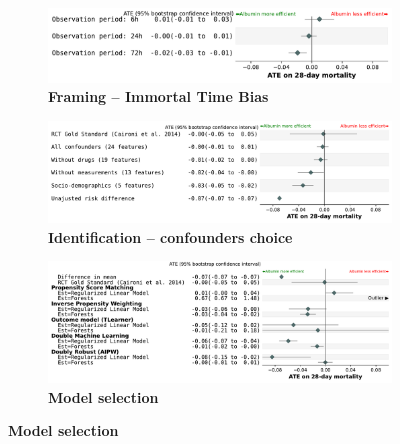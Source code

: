 \documentclass[10pt,letterpaper]{article}
\providecommand{\DIFaddbeginFL}{} %
\providecommand{\DIFaddendFL}{} %
\providecommand{\DIFdelbeginFL}{} %
\providecommand{\DIFdelendFL}{} %
\newcommand{\DIFscaledelfig}{0.5}
\newlength{\DIFdelgraphicswidth} %
\newlength{\DIFdelgraphicsheight} %
\newcommand{\DIFaddincludegraphics}[2][]{{\color{blue}\fbox{\DIFOincludegraphics[#1]{#2}}}} %
\newcommand{\DIFdelincludegraphics}[2][]{%
\sbox{\DIFdelgraphicsbox}{\DIFOincludegraphics[#1]{#2}}%
\settoboxwidth{\DIFdelgraphicswidth}{\DIFdelgraphicsbox} %
\settoboxtotalheight{\DIFdelgraphicsheight}{\DIFdelgraphicsbox} %
\scalebox{\DIFscaledelfig}{%
\parbox[b]{\DIFdelgraphicswidth}{\usebox{\DIFdelgraphicsbox}\\[-\baselineskip] \rule{\DIFdelgraphicswidth}{0em}}\llap{\resizebox{\DIFdelgraphicswidth}{\DIFdelgraphicsheight}{%
\setlength{\unitlength}{\DIFdelgraphicswidth}%
\begin{picture}(1,1)%
\thicklines\linethickness{2pt} %
{\color[rgb]{1,0,0}\put(0,0){\framebox(1,1){}}}%
{\color[rgb]{1,0,0}\put(0,0){\line( 1,1){1}}}%
{\color[rgb]{1,0,0}\put(0,1){\line(1,-1){1}}}%
\end{picture}%
}\hspace*{3pt}}} %
} %
\DeclareRobustCommand{\DIFaddbeginFL}{\DIFOaddbeginFL \let\includegraphics\DIFaddincludegraphics} %
\DeclareRobustCommand{\DIFaddendFL}{\DIFOaddendFL \let\includegraphics\DIFOincludegraphics} %
\DeclareRobustCommand{\DIFdelbeginFL}{\DIFOdelbeginFL \let\includegraphics\DIFdelincludegraphics} %
\DeclareRobustCommand{\DIFdelendFL}{\DIFOaddendFL \let\includegraphics\DIFOincludegraphics} %
\begin{document}
\begin{figure}[h!]
  \begin{subfigure}[b]{\linewidth}
    \caption{\bfseries Framing -- Immortal Time Bias}\label{fig:vibration:itb}
    \DIFdelbeginFL %
    \DIFdelendFL \DIFaddbeginFL \includegraphics[width=0.765\linewidth, right]{img_final/Fig3a.pdf}
    \DIFaddendFL \end{subfigure}
  \vfill
  \begin{subfigure}[b]{\linewidth}
    \centering
    \caption{\bfseries Identification -- confounders choice}\label{fig:vibration:confounders}
    \DIFdelbeginFL %
    \DIFdelendFL \DIFaddbeginFL \includegraphics[width=.9\linewidth, right]{img_final/Fig3b.pdf}
    \DIFaddendFL \end{subfigure}
  \vfill
  \begin{subfigure}[b]{\linewidth}
    \centering
    \caption{\bfseries Model selection}\label{fig:vibration:models}
    \DIFdelbeginFL %
    \DIFdelendFL \DIFaddbeginFL \includegraphics[width=0.891\linewidth, right]{img_final/Fig3c.pdf}
    \DIFaddendFL \end{subfigure}

\end{figure}
\end{document}
